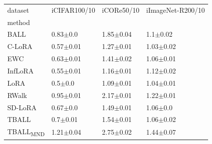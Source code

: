 \begin{tabular}{llll}
\toprule
dataset & iCIFAR100/10 & iCORe50/10 & iImageNet-R200/10 \\
method &  &  &  \\
\midrule
BALL & 0.83$\pm$0.0 & 1.85$\pm$0.04 & 1.1$\pm$0.02 \\
C-LoRA & 0.57$\pm$0.01 & 1.27$\pm$0.01 & 1.03$\pm$0.02 \\
EWC & 0.63$\pm$0.01 & 1.41$\pm$0.02 & 1.06$\pm$0.01 \\
InfLoRA & 0.55$\pm$0.01 & 1.16$\pm$0.01 & 1.12$\pm$0.02 \\
LoRA & 0.5$\pm$0.0 & 1.09$\pm$0.01 & 1.04$\pm$0.01 \\
RWalk & 0.95$\pm$0.01 & 2.17$\pm$0.01 & 1.22$\pm$0.01 \\
SD-LoRA & 0.67$\pm$0.0 & 1.49$\pm$0.01 & 1.06$\pm$0.0 \\
TBALL & 0.7$\pm$0.01 & 1.54$\pm$0.01 & 1.06$\pm$0.02 \\
TBALL\textsubscript{MND} & 1.21$\pm$0.04 & 2.75$\pm$0.02 & 1.44$\pm$0.07 \\
\bottomrule
\end{tabular}

